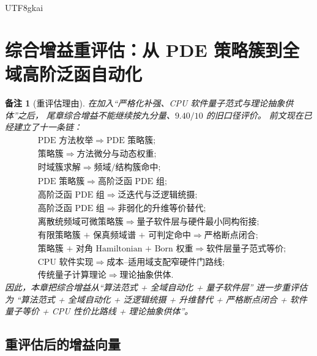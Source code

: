 \documentclass[12pt]{article}
\newtheorem{remark}{备注}[section]
\begin{document}
\begin{CJK*}{UTF8}{gkai}
\section{综合增益重评估：从 PDE 策略簇到全域高阶泛函自动化}
\label{sec:tex53-gain}

\begin{remark}[重评估理由]
在加入“严格化补强、CPU 软件量子范式与理论抽象供体”之后，
尾章综合增益不能继续按九分量、\(9.40/10\) 的旧口径评价。
前文现在已经建立了十一条链：
\[
\begin{aligned}
  &\text{PDE 方法枚举}
  \Longrightarrow
  \text{PDE 策略簇};\\
  &\text{策略簇}
  \Longrightarrow
  \text{方法微分与动态权重};\\
  &\text{时域簇求解}
  \Longrightarrow
  \text{频域/结构簇命中};\\
  &\text{PDE 策略簇}
  \Longrightarrow
  \text{高阶泛函 PDE 组};\\
  &\text{高阶泛函 PDE 组}
  \Longrightarrow
  \text{泛迭代与泛逻辑统摄};\\
  &\text{高阶泛函 PDE 组}
  \Longrightarrow
  \text{非弱化的升维等价替代};\\
  &\text{离散统频域可微策略簇}
  \Longrightarrow
  \text{量子软件层与硬件最小同构衔接};\\
  &\text{有限策略簇 + 保真频域谱 + 可判定命中}
  \Longrightarrow
  \text{严格断点闭合};\\
  &\text{策略簇 + 对角 Hamiltonian + Born 权重}
  \Longrightarrow
  \text{软件层量子范式等价};\\
  &\text{CPU 软件实现}
  \Longrightarrow
  \text{成本--适用域支配窄硬件门路线};\\
  &\text{传统量子计算理论}
  \Longrightarrow
  \text{理论抽象供体}.
\end{aligned}
\]
因此，本章把综合增益从“算法范式 + 全域自动化 + 量子软件层”
进一步重评估为
“算法范式 + 全域自动化 + 泛逻辑统摄 + 升维替代
+ 严格断点闭合 + 软件量子等价 + CPU 性价比路线
+ 理论抽象供体”。
\end{remark}

\subsection{重评估后的增益向量}
\label{subsec:tex53-gain-vector}


\end{CJK*}
\end{document}
